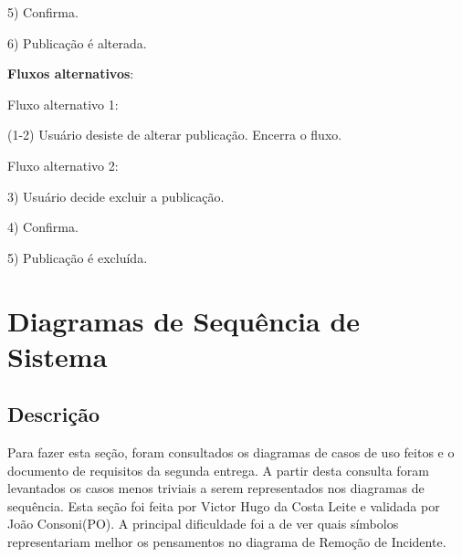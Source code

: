 \documentclass[12pt]{article}
\begin{document}
5) Confirma.

6) Publicação é alterada.

\textbf{Fluxos alternativos}:

Fluxo alternativo 1:

(1-2) Usuário desiste de alterar publicação. Encerra o fluxo.

Fluxo alternativo 2:

3) Usuário decide excluir a publicação.

4) Confirma.

5) Publicação é excluída.

\vfill%
\pagebreak%

\section{Diagramas de Sequência de Sistema}

\subsection{Descrição}
Para fazer esta seção, foram consultados os diagramas de casos de uso feitos e o documento de requisitos da segunda entrega. A partir desta consulta foram levantados os casos menos triviais a serem representados nos diagramas de sequência. Esta seção foi feita por Victor Hugo da Costa Leite e validada por João Consoni(PO). A principal dificuldade foi a de ver quais símbolos representariam melhor os pensamentos no diagrama de Remoção de Incidente.
\end{document}
